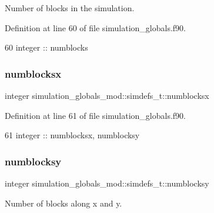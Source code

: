 Number of blocks in the simulation. 



Definition at line 60 of file simulation\+\_\+globals.\+f90.


\begin{DoxyCode}
60         \textcolor{keywordtype}{integer}         ::  numblocks
\end{DoxyCode}
\mbox{\label{structsimulation__globals__mod_1_1simdefs__t_aebf8c5891821bfe845922fdcead042d6}} 
\subsubsection{\texorpdfstring{numblocksx}{numblocksx}}
{\footnotesize\ttfamily integer simulation\+\_\+globals\+\_\+mod\+::simdefs\+\_\+t\+::numblocksx\hspace{0.3cm}{\ttfamily [private]}}



Definition at line 61 of file simulation\+\_\+globals.\+f90.


\begin{DoxyCode}
61         \textcolor{keywordtype}{integer}         ::  numblocksx, numblocksy
\end{DoxyCode}
\mbox{\label{structsimulation__globals__mod_1_1simdefs__t_a46d35c673edb6e991a57ff9ed925e1bf}} 
\subsubsection{\texorpdfstring{numblocksy}{numblocksy}}
{\footnotesize\ttfamily integer simulation\+\_\+globals\+\_\+mod\+::simdefs\+\_\+t\+::numblocksy\hspace{0.3cm}{\ttfamily [private]}}



Number of blocks along x and y. 




